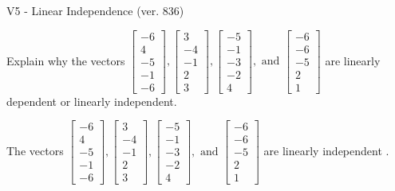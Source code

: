 \begin{exercise}
  \begin{exerciseTitle}V5 - Linear Independence (ver. 836)\end{exerciseTitle}
  \begin{exerciseStatement}
    Explain why the vectors \(\left[\begin{array}{r}
-6 \\
4 \\
-5 \\
-1 \\
-6
\end{array}\right] , \left[\begin{array}{r}
3 \\
-4 \\
-1 \\
2 \\
3
\end{array}\right] , \left[\begin{array}{r}
-5 \\
-1 \\
-3 \\
-2 \\
4
\end{array}\right] , \text{ and } \left[\begin{array}{r}
-6 \\
-6 \\
-5 \\
2 \\
1
\end{array}\right]\) are linearly dependent or linearly independent.	


  \end{exerciseStatement}
  \begin{exerciseAnswer}
   The vectors \(\left[\begin{array}{r}
-6 \\
4 \\
-5 \\
-1 \\
-6
\end{array}\right] , \left[\begin{array}{r}
3 \\
-4 \\
-1 \\
2 \\
3
\end{array}\right] , \left[\begin{array}{r}
-5 \\
-1 \\
-3 \\
-2 \\
4
\end{array}\right] , \text{ and } \left[\begin{array}{r}
-6 \\
-6 \\
-5 \\
2 \\
1
\end{array}\right]\) are 
  	 linearly independent  .
  


  \end{exerciseAnswer}
\end{exercise}
